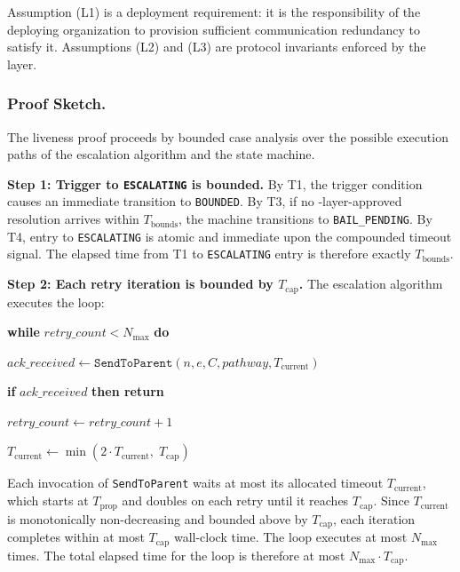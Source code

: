 Assumption (L1) is a deployment requirement: it is the responsibility of the deploying organization to provision sufficient communication redundancy to satisfy it. Assumptions (L2) and (L3) are protocol invariants enforced by the \fact{} layer.

\subsubsection{Proof Sketch.}

The liveness proof proceeds by bounded case analysis over the possible execution paths of the escalation algorithm and the state machine.

\medskip
\noindent\textbf{Step 1: Trigger to \texttt{ESCALATING} is bounded.} By T1, the trigger condition causes an immediate transition to \texttt{BOUNDED}. By T3, if no \fact-layer-approved resolution arrives within $T_{\text{bounds}}$, the machine transitions to \texttt{BAIL\_PENDING}. By T4, entry to \texttt{ESCALATING} is atomic and immediate upon the compounded timeout signal. The elapsed time from T1 to \texttt{ESCALATING} entry is therefore exactly $T_{\text{bounds}}$.

\medskip
\noindent\textbf{Step 2: Each retry iteration is bounded by $T_{\text{cap}}$.} The escalation algorithm executes the loop:

\begin{trivlist}\itemsep=0pt
\item[]\textbf{while} $retry\_count < N_{\max}$ \textbf{do}
\item[]\hspace{1em}$ack\_received \leftarrow \texttt{SendToParent}(n, e, C, pathway, T_{\text{current}})$
\item[]\hspace{1em}\textbf{if} $ack\_received$ \textbf{then return}
\item[]\hspace{1em}$retry\_count \leftarrow retry\_count + 1$
\item[]\hspace{1em}$T_{\text{current}} \leftarrow \min(2 \cdot T_{\text{current}},\; T_{\text{cap}})$
\end{trivlist}

Each invocation of \texttt{SendToParent} waits at most its allocated timeout $T_{\text{current}}$, which starts at $T_{\text{prop}}$ and doubles on each retry until it reaches $T_{\text{cap}}$. Since $T_{\text{current}}$ is monotonically non-decreasing and bounded above by $T_{\text{cap}}$, each iteration completes within at most $T_{\text{cap}}$ wall-clock time. The loop executes at most $N_{\max}$ times. The total elapsed time for the loop is therefore at most $N_{\max} \cdot T_{\text{cap}}$.

